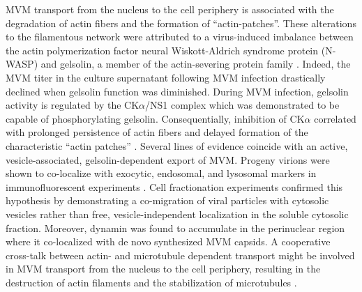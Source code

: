 MVM transport from the nucleus to the cell periphery is associated with the degradation of actin fibers and the formation of “actin-patches”. These alterations to the filamentous network were attributed to a virus-induced imbalance between the actin polymerization factor neural Wiskott-Aldrich syndrome protein (N-WASP) and gelsolin, a member of the actin-severing protein family \cite{pmid15582663}. Indeed, the MVM titer in the culture supernatant following MVM infection drastically declined when gelsolin function was diminished. During MVM infection, gelsolin activity is regulated by the CK$\alpha$/NS1 complex which was demonstrated to be capable of phosphorylating gelsolin. Consequentially, inhibition of CK$\alpha$ correlated with prolonged persistence of actin fibers and delayed formation of the characteristic “actin patches” \cite{pmid18704167, pmid16641266}. Several lines of evidence coincide with an active, vesicle-associated, gelsolin-dependent export of MVM. Progeny virions were shown to co-localize with exocytic, endosomal, and lysosomal markers in immunofluorescent experiments \cite{pmid18704167, pmid17287256}. Cell fractionation experiments confirmed this hypothesis by demonstrating a co-migration of viral particles with cytosolic vesicles rather than free, vesicle-independent localization in the soluble cytosolic fraction. Moreover, dynamin was found to accumulate in the perinuclear region where it co-localized with de novo synthesized MVM capsids. A cooperative cross-talk between actin- and microtubule dependent transport \cite{pmid15040446, pmid12383793, pmid17998399} might be involved in MVM transport from the nucleus to the cell periphery, resulting in the destruction of actin filaments and the stabilization of microtubules \cite{pmid18704167}.  
